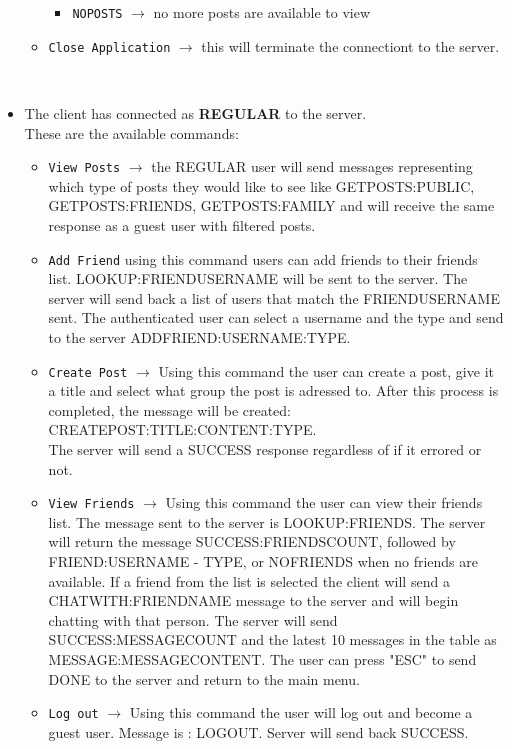 \documentclass[runningheads, a4paper]{llncs}
\begin{document}
\begin{itemize}
\begin{itemize}
\begin{itemize}
            \item \texttt{NOPOSTS} $\rightarrow$ no more posts are available to view
        \end{itemize}
        \item \texttt{Close Application} $\rightarrow$ this will terminate the connectiont to the server.
    \end{itemize}
    \hfill \\
    \item The client has connected as \textbf{REGULAR} to the server. \\
    These are the available commands:
    \begin{itemize}
        \item \texttt{View Posts} $\rightarrow$ the REGULAR user will send messages representing which type of posts they would like to see like GETPOSTS:PUBLIC, GETPOSTS:FRIENDS, GETPOSTS:FAMILY and will receive the same response as a guest user with filtered posts.
        \item \texttt{Add Friend} using this command users can add friends to their friends list. LOOKUP:FRIENDUSERNAME will be sent to the server. The server will send back a list of users that match the FRIENDUSERNAME sent. The authenticated user can select a username and the type and send to the server ADDFRIEND:USERNAME:TYPE.
        \item \texttt{Create Post} $\rightarrow$ Using this command the user can create a post, give it a title and select what group the post is adressed to. After this process is completed, the message will be created: \\CREATEPOST:TITLE:CONTENT:TYPE. \\The server will send a SUCCESS response regardless of if it errored or not.
        \item \texttt{View Friends} $\rightarrow$ Using this command the user can view their friends list. The message sent to the server is LOOKUP:FRIENDS. The server will return the message SUCCESS:FRIENDSCOUNT, followed by \\FRIEND:USERNAME - TYPE, or NOFRIENDS when no friends are available. If a friend from the list is selected the client will send a CHATWITH:FRIENDNAME message to the server and will begin chatting with that person. The server will send SUCCESS:MESSAGECOUNT and the latest 10 messages in the table as MESSAGE:MESSAGECONTENT. The user can press "ESC" to send DONE to the server and return to the main menu.
        \item \texttt{Log out} $\rightarrow$ Using this command the user will log out and become a guest user. Message is : LOGOUT. Server will send back SUCCESS.

\end{itemize}
\end{itemize}
\end{document}
